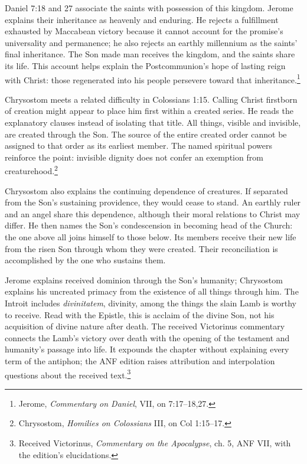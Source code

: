 Daniel 7:18 and 27 associate the saints with possession of this kingdom. Jerome explains their inheritance as heavenly and enduring. He rejects a fulfillment exhausted by Maccabean victory because it cannot account for the promise's universality and permanence; he also rejects an earthly millennium as the saints' final inheritance. The Son made man receives the kingdom, and the saints share its life. This account helps explain the Postcommunion's hope of lasting reign with Christ: those regenerated into his people persevere toward that inheritance.\footnote{Jerome, \emph{Commentary on Daniel}, VII, on 7:17--18,27.}

Chrysostom meets a related difficulty in Colossians 1:15. Calling Christ firstborn of creation might appear to place him first within a created series. He reads the explanatory clauses instead of isolating that title. All things, visible and invisible, are created through the Son. The source of the entire created order cannot be assigned to that order as its earliest member. The named spiritual powers reinforce the point: invisible dignity does not confer an exemption from creaturehood.\footnote{Chrysostom, \emph{Homilies on Colossians} III, on Col 1:15--17.}

Chrysostom also explains the continuing dependence of creatures. If separated from the Son's sustaining providence, they would cease to stand. An earthly ruler and an angel share this dependence, although their moral relations to Christ may differ. He then names the Son's condescension in becoming head of the Church: the one above all joins himself to those below. Its members receive their new life from the risen Son through whom they were created. Their reconciliation is accomplished by the one who sustains them.

Jerome explains received dominion through the Son's humanity; Chrysostom explains his uncreated primacy from the existence of all things through him. The Introit includes \emph{divinitatem}, divinity, among the things the slain Lamb is worthy to receive. Read with the Epistle, this is acclaim of the divine Son, not his acquisition of divine nature after death. The received Victorinus commentary connects the Lamb's victory over death with the opening of the testament and humanity's passage into life. It expounds the chapter without explaining every term of the antiphon; the ANF edition raises attribution and interpolation questions about the received text.\footnote{Received Victorinus, \emph{Commentary on the Apocalypse}, ch. 5, ANF VII, with the edition's elucidations.}

